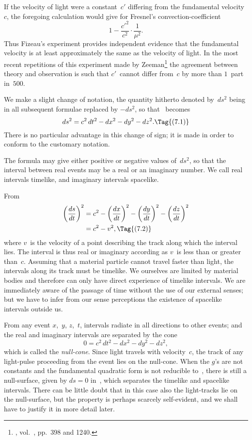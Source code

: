 \documentclass[12pt]{book}
\begin{document}
If the velocity of light  were a constant~$c'$ differing from the
fundamental velocity~$c$, the foregoing calculation would give for Fresnel's
convection-coefficient
\[
1 - \frac{c'^{2}}{c^{2}} \cdot \frac{1}{\mu^{2}}.
\]
Thus Fizeau's experiment provides independent evidence that the fundamental
%
velocity is at least approximately the same as the velocity of light. In the most
recent repetitions of this experiment made by Zeeman\footnote
  {, vol.~, pp.~398 and 1240.}
the agreement between
theory and observation is such that $c'$~cannot differ from~$c$ by more than $1$~part
in~$500$.

%
%

We make a slight change of notation, the quantity hitherto denoted by~$ds^{2}$
being in all subsequent formulae replaced by $-ds^{2}$, so that ~becomes
\[
ds^{2} = c^{2}\, dt^{2} - dx^{2} - dy^{2} - dz^{2}.
\Tag{(7.1)}
\]
There is no particular advantage in this change of sign; it is made in order
to conform to the customary notation.

The formula may give either positive or negative values of~$ds^{2}$, so that the
interval between real events may be a real or an imaginary number. We call
real intervals timelike, and imaginary intervals spacelike.

From 
\begin{align*}
  \left(\frac{ds}{dt}\right)^{2}
  &= c^{2} - \left(\frac{dx}{dt}\right)^{2} - \left(\frac{dy}{dt}\right)^{2} - \left(\frac{dz}{dt}\right)^{2} \\
  &= c^{2} - v^{2},
  \Tag{(7.2)}
\end{align*}
where $v$~is the velocity of a point describing the track along which the interval
lies. The interval is thus real or imaginary according as $v$~is less than or
greater than~$c$. Assuming that a material particle cannot travel faster than
light, the intervals along its track must be timelike. We ourselves are limited
by material bodies and therefore can only have direct experience of timelike
intervals. We are immediately aware of the passage of time without the use
of our external senses; but we have to infer from our sense perceptions the
existence of spacelike intervals outside us.

From any event $x$,~$y$, $z$,~$t$, intervals radiate in all directions to other events;
and the real and imaginary intervals are separated by the cone
\[
0 = c^{2}\, dt^{2} - dx^{2} - dy^{2} - dz^{2},
\]
which is called the \emph{null-cone}. Since light travels with velocity~$c$, the track of
%
any light-pulse proceeding from the event lies on the null-cone. When the
$g$'s are not constants and the fundamental quadratic form is not reducible to~,
there is still a null-surface, given by $ds = 0$ in~, which separates the
timelike and spacelike intervals. There can be little doubt that in this case
also the light-tracks lie on the null-surface, but the property is perhaps scarcely
self-evident, and we shall have to justify it in more detail later.
\end{document}
